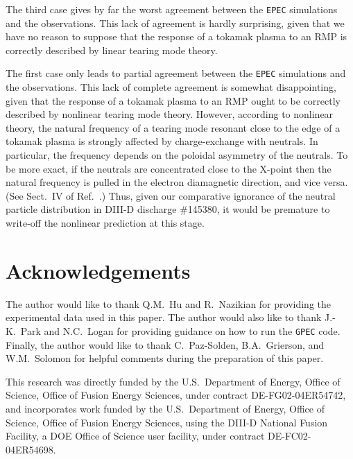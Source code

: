 \documentclass[12pt,prb,aps]{revtex4-1}
\begin{document}
 The third case gives by far the worst agreement between the {\tt EPEC} simulations and the  observations. This lack of agreement is hardly surprising, given
that we have no reason to suppose that the response of a tokamak plasma to an RMP is correctly described by linear tearing mode theory.\cite{rf1} 

The first case only leads to partial agreement between  the {\tt EPEC} simulations and the  observations. This lack of complete agreement is somewhat
disappointing, given that the response of a tokamak plasma to an RMP ought to be correctly described by nonlinear tearing mode theory. However, according to
nonlinear theory, the natural frequency of a tearing mode resonant close to the edge of a tokamak plasma is strongly affected by charge-exchange with neutrals.\cite{rf2}
In particular, the frequency depends on the poloidal asymmetry of the neutrals. To be more exact, if the neutrals are concentrated close to the X-point then the
natural frequency is pulled in the electron diamagnetic direction, and vice versa.\cite{rf2} (See Sect.~IV of Ref.~.) Thus, given our comparative ignorance of the neutral particle
distribution in DIII-D discharge \#145380, it would be premature to write-off the nonlinear prediction at this stage.  

\section*{Acknowledgements}
The author would like to thank Q.M.~Hu and R.~Nazikian for providing the experimental data used in this paper. The
author would also like to thank J.-K.~Park and N.C.~Logan for providing guidance on how to run the {\tt GPEC} code. Finally, the
author would like to thank C.~Paz-Solden, B.A.~Grierson, and W.M.~Solomon for helpful comments during the preparation of this paper. 

This research was directly funded by the U.S.\ Department of Energy, Office of Science, Office of Fusion Energy Sciences,  under contract DE-FG02-04ER54742, and
incorporates work funded by the U.S.\ Department of Energy, Office of Science, Office of Fusion Energy Sciences, using the DIII-D National Fusion Facility, a DOE Office of Science user facility, under contract DE-FC02-04ER54698.  
\end{document}
